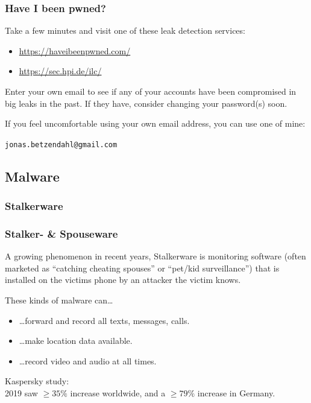 \documentclass[aspectratio=1610,dvipsnames]{beamer}
\begin{document}

\begin{frame}
\frametitle{Have I been pwned?}

Take a few minutes and visit one of these leak detection services:

\begin{itemize}
\item\url{https://haveibeenpwned.com/}
\item\url{https://sec.hpi.de/ilc/}
\end{itemize}
\bigskip

Enter your own email to see if any of your accounts have been compromised in big leaks in the past. If they have, consider changing your password(s) soon.
\bigskip\bigskip

If you feel uncomfortable using your own email address, you can use one of mine:
\begin{center}
\texttt{jonas.betzendahl@gmail.com}
\end{center}

\end{frame}


\subsection{Malware}

\subsubsection{Stalkerware}

\begin{frame}
\frametitle{Stalker- \& Spouseware}

A growing phenomenon in recent years, Stalkerware is monitoring software (often marketed as ``catching cheating spouses'' or ``pet/kid surveillance'') that is installed on the victims phone by an attacker the victim knows.
\bigskip

These kinds of malware can\dots

\begin{itemize}
\item\dots forward and record all texts, messages, calls.
\item\dots make location data available.
\item\dots record video and audio at all times.
\end{itemize}
\pause\bigskip

Kaspersky study:\\ 2019 saw $\geq 35\%$ increase worldwide, and a $\geq 79\%$ increase in Germany.
\end{frame}
\end{document}
